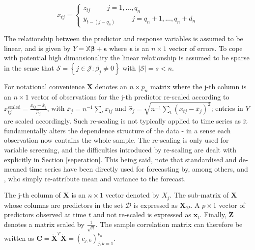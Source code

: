 \documentclass[11pt]{report}\usepackage[utf8]{inputenc}
\begin{document}
\begin{equation*} \label{predictors}
    x_{tj} = \left\{\begin{matrix}
    z_{tj} \hspace{1cm} j = 1,...,q_n\\ 
    y_{t-(j-q_n)} \hspace{1cm} j = q_n+1,...,q_n+d_n
\end{matrix}\right.
\end{equation*}

The relationship between the predictor and response variables is assumed to be linear, and is given by $Y = \mathbb{X} \boldsymbol{\beta} + \boldsymbol{\epsilon}$ where $\boldsymbol{\epsilon}$ is an $n \times 1$ vector of errors. To cope with potential high dimansionality the linear relationship is assumed to be sparse in the sense that $\mathcal{S} = \left \{ j \in \mathcal{J} : \beta_j \neq 0 \right \}$ with $\left | \mathcal{S} \right | = s < n $. 

For notational convenience $\mathbf{X}$ denotes an $n \times p_n$ matrix where the j-th column is an $n \times 1$ vector of observations for the j-th predictor re-scaled according to $x_{tj}^\text{scaled} = \frac{x_{tj} - \overline{x}_j}{\widehat{\sigma}_j}$, with $\overline{x}_j = n^{-1}\sum_t x_{tj}$ and $\widehat{\sigma}_j = \sqrt{n^{-1} \sum_t\left ( x_{tj} - \overline{x}_j \right )^2}$; entries in $Y$ are scaled accordingly. Such re-scaling is not typically applied to time series as it fundamentally alters the dependence structure of the data - in a sense each observation now contains the whole sample. The re-scaling is only used for variable screening, and the difficulties introduced by re-scaling are dealt with explicitly in Section \ref{seperation}. This being said, note that standardised and de-meaned time series have been directly used for forecasting by, among others, \cite{song2011large} and \cite{de2008forecasting}, who simply re-attribute mean and variance to the forecast. 

The j-th column of $\mathbf{X}$ is an $n \times 1$ vector denoted by $X_j$. The sub-matrix of $\mathbf{X}$ whose columns are predictors in the set $\mathcal{D}$ is expressed as $\mathbf{X}_\mathcal{D}$. A $p \times 1$ vector of predictors observed at time $t$ and not re-scaled is expressed as $\boldsymbol{x}_t$. Finally, $\mathring{\mathbf{Z}}$ denotes a matrix scaled by $\frac{1}{\sqrt{n}}$. The sample correlation matrix can therefore be written as $\mathbf{C} = \mathring{\mathbf{X}}^T\mathring{\mathbf{X}} = \left ( c_{j,k} \right )_{j,k = 1}^{p_n}$. 
\end{document}
